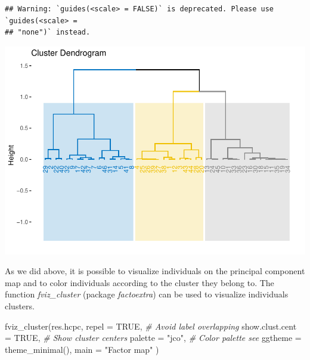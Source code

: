 \documentclass[
]{article}
\newenvironment{Shaded}{\begin{snugshade}}{\end{snugshade}}
\newcommand{\AttributeTok}[1]{\textcolor[rgb]{0.77,0.63,0.00}{#1}}
\newcommand{\CommentTok}[1]{\textcolor[rgb]{0.56,0.35,0.01}{\textit{#1}}}
\newcommand{\ConstantTok}[1]{\textcolor[rgb]{0.00,0.00,0.00}{#1}}
\newcommand{\FunctionTok}[1]{\textcolor[rgb]{0.00,0.00,0.00}{#1}}
\newcommand{\NormalTok}[1]{#1}
\newcommand{\StringTok}[1]{\textcolor[rgb]{0.31,0.60,0.02}{#1}}
\begin{document}
\begin{verbatim}
## Warning: `guides(<scale> = FALSE)` is deprecated. Please use `guides(<scale> =
## "none")` instead.
\end{verbatim}

\includegraphics{clustering_files/figure-latex/unnamed-chunk-54-1.pdf}

As we did above, it is possible to visualize individuals on the
principal component map and to color individuals according to the
cluster they belong to. The function \emph{fviz\_cluster} (package
\emph{factoextra}) can be used to visualize individuals clusters.

\begin{Shaded}
\begin{Highlighting}[]
\FunctionTok{fviz\_cluster}\NormalTok{(res.hcpc,}
             \AttributeTok{repel =} \ConstantTok{TRUE}\NormalTok{,            }\CommentTok{\# Avoid label overlapping}
             \AttributeTok{show.clust.cent =} \ConstantTok{TRUE}\NormalTok{, }\CommentTok{\# Show cluster centers}
             \AttributeTok{palette =} \StringTok{"jco"}\NormalTok{,     }\CommentTok{\# Color palette see }
             \AttributeTok{ggtheme =} \FunctionTok{theme\_minimal}\NormalTok{(),}
             \AttributeTok{main =} \StringTok{"Factor map"}
\NormalTok{             )}
\end{Highlighting}
\end{Shaded}
\end{document}
